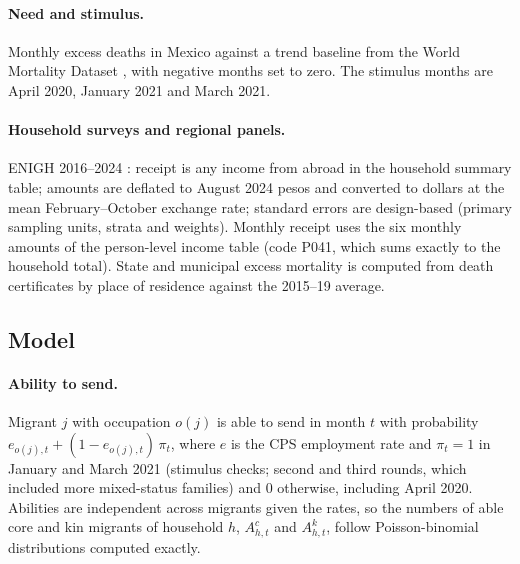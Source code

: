 \documentclass[11pt]{article}
\begin{document}
\paragraph{Need and stimulus.} Monthly excess deaths in Mexico against a trend baseline from the World Mortality Dataset \citep{karlinsky2021}, with negative months set to zero. The stimulus months are April 2020, January 2021 and March 2021.

\paragraph{Household surveys and regional panels.} ENIGH 2016--2024 \citep{enigh}: receipt is any income from abroad in the household summary table; amounts are deflated to August 2024 pesos and converted to dollars at the mean February--October exchange rate; standard errors are design-based (primary sampling units, strata and weights). Monthly receipt uses the six monthly amounts of the person-level income table (code P041, which sums exactly to the household total). State and municipal excess mortality is computed from death certificates by place of residence against the 2015--19 average.

\subsection{Model}

\paragraph{Ability to send.} Migrant $j$ with occupation $o(j)$ is able to send in month $t$ with probability $e_{o(j),t} + (1 - e_{o(j),t})\,\pi_t$, where $e$ is the CPS employment rate and $\pi_t = 1$ in January and March 2021 (stimulus checks; second and third rounds, which included more mixed-status families) and 0 otherwise, including April 2020. Abilities are independent across migrants given the rates, so the numbers of able core and kin migrants of household $h$, $A^c_{h,t}$ and $A^k_{h,t}$, follow Poisson-binomial distributions computed exactly.
\end{document}
